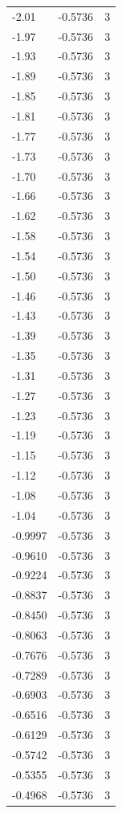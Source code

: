 \begin{longtable}{lrr}
  -2.01 & -0.5736 & 3 \\
  -1.97 & -0.5736 & 3 \\
  -1.93 & -0.5736 & 3 \\
  -1.89 & -0.5736 & 3 \\
  -1.85 & -0.5736 & 3 \\
  -1.81 & -0.5736 & 3 \\
  -1.77 & -0.5736 & 3 \\
  -1.73 & -0.5736 & 3 \\
  -1.70 & -0.5736 & 3 \\
  -1.66 & -0.5736 & 3 \\
  -1.62 & -0.5736 & 3 \\
  -1.58 & -0.5736 & 3 \\
  -1.54 & -0.5736 & 3 \\
  -1.50 & -0.5736 & 3 \\
  -1.46 & -0.5736 & 3 \\
  -1.43 & -0.5736 & 3 \\
  -1.39 & -0.5736 & 3 \\
  -1.35 & -0.5736 & 3 \\
  -1.31 & -0.5736 & 3 \\
  -1.27 & -0.5736 & 3 \\
  -1.23 & -0.5736 & 3 \\
  -1.19 & -0.5736 & 3 \\
  -1.15 & -0.5736 & 3 \\
  -1.12 & -0.5736 & 3 \\
  -1.08 & -0.5736 & 3 \\
  -1.04 & -0.5736 & 3 \\
  -0.9997 & -0.5736 & 3 \\
  -0.9610 & -0.5736 & 3 \\
  -0.9224 & -0.5736 & 3 \\
  -0.8837 & -0.5736 & 3 \\
  -0.8450 & -0.5736 & 3 \\
  -0.8063 & -0.5736 & 3 \\
  -0.7676 & -0.5736 & 3 \\
  -0.7289 & -0.5736 & 3 \\
  -0.6903 & -0.5736 & 3 \\
  -0.6516 & -0.5736 & 3 \\
  -0.6129 & -0.5736 & 3 \\
  -0.5742 & -0.5736 & 3 \\
  -0.5355 & -0.5736 & 3 \\
  -0.4968 & -0.5736 & 3 \\

\end{longtable}
